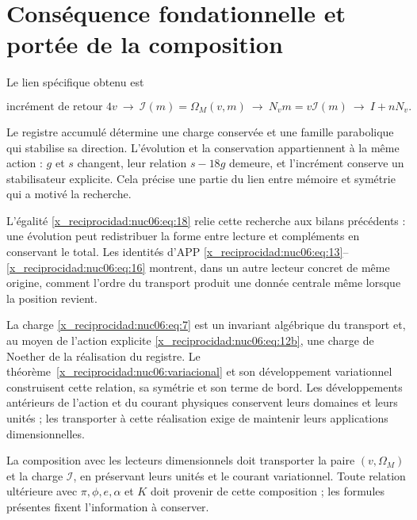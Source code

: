 \section{Conséquence fondationnelle et portée de la composition}

Le lien spécifique obtenu est

\begin{equation}
\text{incrément de retour }4v
\ \longrightarrow\ \mathcal I(m)=\Omega_M(v,m)
\ \longrightarrow\ N_vm=v\mathcal I(m)
\ \longrightarrow\ I+nN_v.
\label{x_reciprocidad:nuc06:eq:21}
\end{equation}

Le registre accumulé détermine une charge conservée et une famille parabolique qui stabilise sa direction. L’évolution et la conservation appartiennent à la même action : \(g\) et \(s\) changent, leur relation \(s-18g\) demeure, et l’incrément conserve un stabilisateur explicite. Cela précise une partie du lien entre mémoire et symétrie qui a motivé la recherche.

L’égalité \eqref{x_reciprocidad:nuc06:eq:18} relie cette recherche aux bilans précédents : une évolution peut redistribuer la forme entre lecture et compléments en conservant le total. Les identités d’APP \eqref{x_reciprocidad:nuc06:eq:13}–\eqref{x_reciprocidad:nuc06:eq:16} montrent, dans un autre lecteur concret de même origine, comment l’ordre du transport produit une donnée centrale même lorsque la position revient.

La charge \eqref{x_reciprocidad:nuc06:eq:7} est un invariant algébrique du transport et, au moyen de l’action explicite \eqref{x_reciprocidad:nuc06:eq:12b}, une charge de Noether de la réalisation du registre. Le théorème~\ref{x_reciprocidad:nuc06:variacional} et son développement variationnel construisent cette relation, sa symétrie et son terme de bord. Les développements antérieurs de l’action et du courant physiques conservent leurs domaines et leurs unités ; les transporter à cette réalisation exige de maintenir leurs applications dimensionnelles.

La composition avec les lecteurs dimensionnels doit transporter la paire \((v,\Omega_M)\) et la charge \(\mathcal I\), en préservant leurs unités et le courant variationnel. Toute relation ultérieure avec \(\pi,\phi,e,\alpha\) et \(K\) doit provenir de cette composition ; les formules présentes fixent l’information à conserver.
